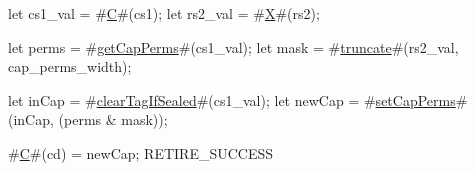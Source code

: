 let cs1_val = #\hyperref[sailRISCVzC]{C}#(cs1);
let rs2_val = #\hyperref[sailRISCVzX]{X}#(rs2);

let perms = #\hyperref[sailRISCVzgetCapPerms]{getCapPerms}#(cs1_val);
let mask = #\hyperref[sailRISCVztruncate]{truncate}#(rs2_val, cap_perms_width);

let inCap = #\hyperref[sailRISCVzclearTagIfSealed]{clearTagIfSealed}#(cs1_val);
let newCap = #\hyperref[sailRISCVzsetCapPerms]{setCapPerms}#(inCap, (perms & mask));

#\hyperref[sailRISCVzC]{C}#(cd) = newCap;
RETIRE_SUCCESS
